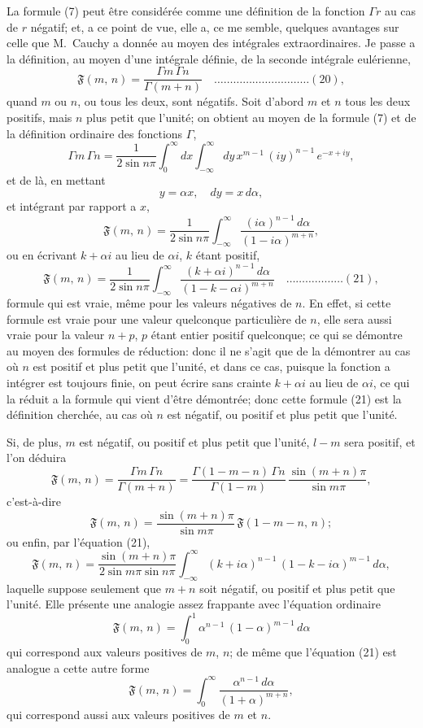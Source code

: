 \documentclass[12pt,a4paper]{article}
\theoremstyle{plain}
\begin{document}
La formule (7) peut \^etre consid\'er\'ee comme une d\'efinition de la fonction $\Gamma r$ au cas de $r$ n\'egatif; et, a ce point de vue, elle a, ce me semble, quelques avantages sur celle que M.~Cauchy a donn\'ee au moyen des int\'egrales extraordinaires. Je passe a la d\'efinition, au moyen d'une int\'egrale d\'efinie, de la seconde int\'egrale eul\'erienne,
\[
\mathfrak{F}(m,\, n) = \frac{\Gamma m \, \Gamma n}{\Gamma(m + n)} \quad \ldots \ldots \ldots \ldots \ldots \ldots \ldots \ldots \ldots \ldots (20),
\]
quand $m$ ou $n$, ou tous les deux, sont n\'egatifs. Soit d'abord $m$ et $n$ tous les deux positifs, mais $n$ plus petit que l'unit\'e; on obtient au moyen de la formule (7) et de la d\'efinition ordinaire des fonctions $\Gamma$,
\[
\Gamma m \, \Gamma n = \frac{1}{2\sin n\pi} \int_0^{\infty} dx \int_{-\infty}^{\infty} dy \, x^{m-1}\, (iy)^{n-1}\, e^{-x+iy},
\]
et de l\`a, en mettant
\[
y = \alpha x, \quad dy = x\, d\alpha,
\]
et int\'egrant par rapport a $x$,
\[
\mathfrak{F}(m,\, n) = \frac{1}{2\sin n\pi} \int_{-\infty}^{\infty} \frac{(i\alpha)^{n-1}\, d\alpha}{(1 - i\alpha)^{m+n}},
\]
ou en \'ecrivant $k + \alpha i$ au lieu de $\alpha i$, $k$ \'etant positif,
\[
\mathfrak{F}(m,\, n) = \frac{1}{2\sin n\pi} \int_{-\infty}^{\infty} \frac{(k + \alpha i)^{n-1}\, d\alpha}{(1 - k - \alpha i)^{m+n}} \quad \ldots \ldots \ldots \ldots \ldots \ldots (21),
\]
formule qui est vraie, m\^eme pour les valeurs n\'egatives de $n$. En effet, si cette formule est vraie pour une valeur quelconque particuli\`ere de $n$, elle sera aussi vraie pour la valeur $n + p$, $p$ \'etant entier positif quelconque; ce qui se d\'emontre au moyen des formules de r\'eduction: donc il ne s'agit que de la d\'emontrer au cas o\`u $n$ est positif et plus petit que l'unit\'e, et dans ce cas, puisque la fonction a int\'egrer est toujours finie, on peut \'ecrire sans crainte $k + \alpha i$ au lieu de $\alpha i$, ce qui la r\'eduit a la formule qui vient d'\^etre d\'emontr\'ee; donc cette formule (21) est la d\'efinition cherch\'ee, au cas o\`u $n$ est n\'egatif, ou positif et plus petit que l'unit\'e.

Si, de plus, $m$ est n\'egatif, ou positif et plus petit que l'unit\'e, $l - m$ sera positif, et l'on d\'eduira
\[
\mathfrak{F}(m,\, n) = \frac{\Gamma m \, \Gamma n}{\Gamma(m+n)} = \frac{\Gamma(1 - m - n)\, \Gamma n}{\Gamma(1 - m)} \, \frac{\sin(m+n)\pi}{\sin m\pi},
\]
c'est-\`a-dire
\[
\mathfrak{F}(m,\, n) = \frac{\sin(m+n)\pi}{\sin m\pi} \, \mathfrak{F}(1 - m - n,\, n);
\]
ou enfin, par l'\'equation (21),
\[
\mathfrak{F}(m,\, n) = \frac{\sin(m+n)\pi}{2\sin m\pi \sin n\pi} \int_{-\infty}^{\infty} (k + i\alpha)^{n-1}\,(1 - k - i\alpha)^{m-1}\, d\alpha,
\]
laquelle suppose seulement que $m + n$ soit n\'egatif, ou positif et plus petit que l'unit\'e. Elle pr\'esente une analogie assez frappante avec l'\'equation ordinaire
\[
\mathfrak{F}(m,\, n) = \int_0^1 \alpha^{n-1}\,(1 - \alpha)^{m-1}\, d\alpha
\]
qui correspond aux valeurs positives de $m$, $n$; de m\^eme que l'\'equation (21) est analogue a cette autre forme
\[
\mathfrak{F}(m,\, n) = \int_0^{\infty} \frac{\alpha^{n-1}\, d\alpha}{(1 + \alpha)^{m+n}},
\]
qui correspond aussi aux valeurs positives de $m$ et $n$.
\end{document}
